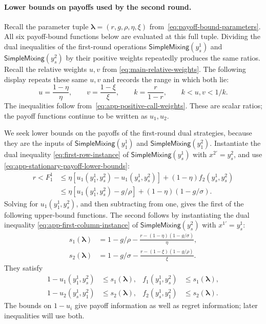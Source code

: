 \documentclass[11pt]{article}
\theoremstyle{remark}
\theoremstyle{plain}
\newcommand{\sm}{\mathsf{SimpleMixing}}
\begin{document}
\paragraph{Lower bounds on payoffs used by the second round.}
Recall the parameter tuple $\boldsymbol\lambda=(r,g,\rho,\eta,\xi)$
from~\eqref{eq:payoff-bound-parameters}. All six payoff-bound
functions below are evaluated at this full tuple.
Dividing the dual inequalities of the first-round operations
$\sm(y_s^1)$ and $\sm(y_s^2)$ by their positive weights repeatedly
produces the same ratios. Recall the relative weights $u,v$ from
\eqref{eq:main-relative-weights}. The following display repeats
these same $u,v$ and records the range in which both lie:
\begin{equation}
 u=\frac{1-\eta}{\eta},\qquad
 v=\frac{1-\xi}{\xi},\qquad
 k=\frac r{1-r},\qquad k<u,v<1/k.
 \label{eq:relative-weights}
\end{equation}
The inequalities follow from~\eqref{eq:app-positive-call-weights}.
These are scalar ratios; the payoff functions continue to be
written as $u_1,u_2$.

We seek lower bounds on the payoffs of the first-round dual
strategies, because they are the inputs of $\sm(y_1^1)$ and
$\sm(y_1^2)$. Instantiate the dual inequality
\eqref{eq:first-row-instance} of $\sm(y_s^1)$ with
$x^{2\prime}=y_s^2$, and use
\eqref{eq:app-stationary-payoff-lower-bounds}:
\begin{equation}
 \begin{aligned}
 r<F_1^1
 &\le\eta[u_1(y_1^1,y_s^2)-u_1(y_s^1,y_s^2)]
                          +(1-\eta)f_2(y_s^1,y_s^2)\\
 &\le\eta[u_1(y_1^1,y_s^2)-g/\rho]
                          +(1-\eta)(1-g/\sigma).
 \end{aligned}
 \label{eq:app-first-row-dual-profile-test}
\end{equation}
Solving for $u_1(y_1^1,y_s^2)$, and then subtracting from one,
gives the first of the following upper-bound functions.
The second follows by instantiating the dual inequality
\eqref{eq:app-first-column-instance} of $\sm(y_s^2)$ with
$x^{1\prime}=y_s^1$:
\begin{equation}
 \begin{aligned}
 s_1(\boldsymbol\lambda)&=1-g/\rho-\frac{r-(1-\eta)(1-g/\sigma)}{\eta},\\
 s_2(\boldsymbol\lambda)&=1-g/\sigma-\frac{r-(1-\xi)(1-g/\rho)}{\xi}.
 \end{aligned}
 \label{eq:payoff-bound-s}
\end{equation}
They satisfy
\begin{equation}
 \begin{aligned}
 1-u_1(y_1^1,y_s^2)&\le s_1(\boldsymbol\lambda),&
 f_1(y_1^1,y_s^2)&\le s_1(\boldsymbol\lambda),\\
 1-u_2(y_s^1,y_1^2)&\le s_2(\boldsymbol\lambda),&
 f_2(y_s^1,y_1^2)&\le s_2(\boldsymbol\lambda).
 \end{aligned}
 \label{eq:app-payoff-bound-s-meaning}
\end{equation}
The bounds on $1-u_i$ give payoff information as well as regret
information; later inequalities will use both.
\end{document}

